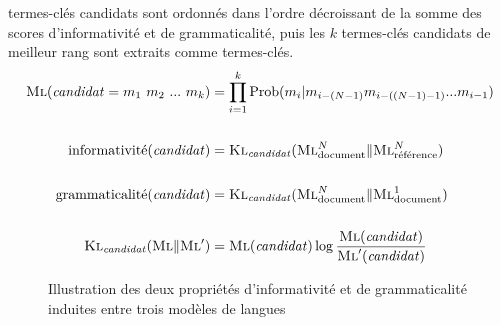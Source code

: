         termes-clés candidats sont ordonnés dans l'ordre décroissant de la somme
        des scores d'informativité et de grammaticalité, puis les $k$
        termes-clés candidats de meilleur rang sont extraits comme termes-clés.
        \begin{align}
          \textsc{Ml}(\text{\textit{candidat}} = m_1\ m_2\ ...\ m_k) &=
          \prod_{i = 1}^k \text{Prob}(m_i | m_{i - (N - 1)} m_{i - ((N - 1) -
          1)} ... m_{i - 1}) \label{math:ml}\\
          \notag\\
          \text{informativité}(\text{\textit{candidat}}) &= \textsc{Kl}_{\text{\textit{candidat}}}(\textsc{Ml}_{\text{document}}^{N} \| \textsc{Ml}_{\text{référence}}^{N}) \label{math:informativeness}\\
          \notag\\
          \text{grammaticalité}(\text{\textit{candidat}}) &= \textsc{Kl}_{\text{\textit{candidat}}}(\textsc{Ml}_{\text{document}}^{N} \| \textsc{Ml}_{\text{document}}^{1}) \label{math:phraseness}\\
          \notag\\
          \textsc{Kl}_{\text{\textit{candidat}}}(\textsc{Ml} \| \textsc{Ml}') &= \textsc{Ml}(\text{\textit{candidat}}) \log \frac{\textsc{Ml}(\text{\textit{candidat}})}{\textsc{Ml}'(\text{\textit{candidat}})} \label{math:kullbackleibler}
        \end{align}
        \begin{figure}
          \centering


          \caption{Illustration des deux propriétés d'informativité et de
                   grammaticalité induites entre trois modèles de
                   langues~\cite{tomokiyo2003languagemodel}
                   \label{fig:klml}}
        \end{figure}

